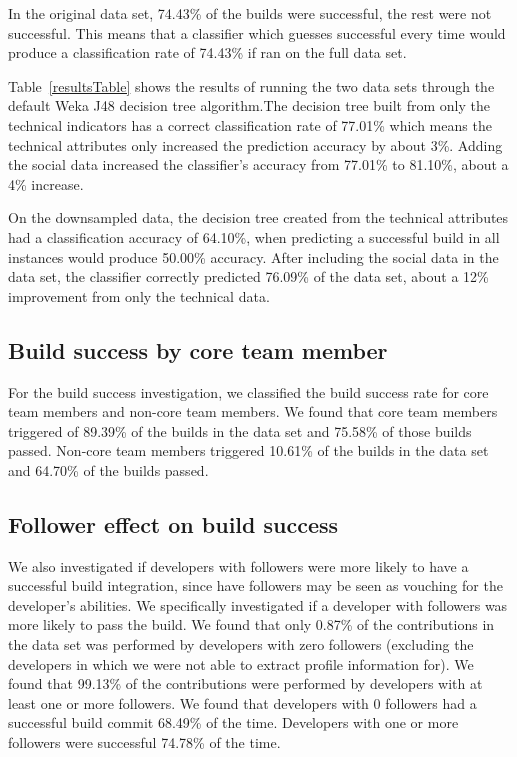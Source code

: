 \documentclass[10pt, conference]{IEEEtran}
\begin{document}
 
In the original data set, 74.43\% of the builds were successful, the rest were not
successful.  This means that a classifier which guesses successful every time
would produce a classification rate of 74.43\% if ran on the full data set. 

Table~\ref{resultsTable} shows the results of running the two data sets through the
default Weka J48 decision tree algorithm.The decision tree built from
only the technical indicators has a correct classification rate of 77.01\% which
means the technical attributes only increased the prediction accuracy by about 3\%.
Adding the social data increased the classifier's accuracy from 77.01\% to
81.10\%, about a 4\% increase.  

On the downsampled data, the decision tree created from the technical attributes
had a classification accuracy of 64.10\%, when predicting a successful build in
all instances would produce 50.00\% accuracy.  After including the social data
in the data set, the classifier correctly predicted 76.09\% of the data set,
about a 12\% improvement from only the technical data.


\subsection{Build success by core team member}

For the build success investigation, we classified the build success rate for
core team members and non-core team members.  We found that core team members
triggered of 89.39\% of the builds in the data set and 75.58\% of those builds
passed.  Non-core team members triggered 10.61\% of the builds in the data set
and 64.70\% of the builds passed.


\subsection{Follower effect on build success}

We also investigated if developers with followers were more likely to have a
successful build integration, since have followers may be seen as vouching for
the developer's abilities.  We specifically investigated if a developer with 
followers was more likely to pass the build.  We found that only 0.87\% of the
contributions in the data set was performed by developers with zero 
followers (excluding the developers in which we were not able to extract profile
information for). We found that 99.13\% of the contributions were performed by
developers with at least one or more followers.
We found that developers with 0 followers had a successful build commit 68.49\%
of the time.  Developers with one or more followers were successful 74.78\% of
the time.
\end{document}
